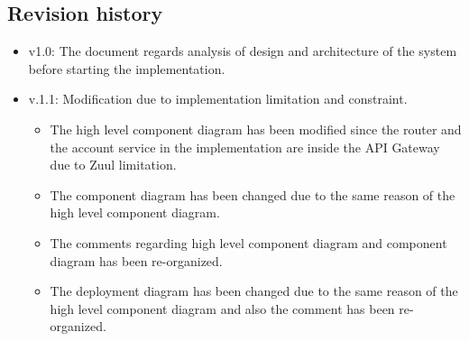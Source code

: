 \subsection{Revision history}
\begin{itemize}
\item v1.0: The document regards analysis of design and architecture of the system before starting the implementation.
\item v.1.1: Modification due to implementation limitation and constraint.
\begin{itemize}
	\item The high level component diagram has been modified since the router and the account service in the implementation are inside the API Gateway due to Zuul limitation.
	\item The component diagram has been changed due to the same reason of the high level component diagram.
	\item The comments regarding high level component diagram and component diagram has been re-organized.
	\item The deployment diagram has been changed due to the same reason of the high level component diagram and also the comment has been re-organized. 
\end{itemize}
\end{itemize}

